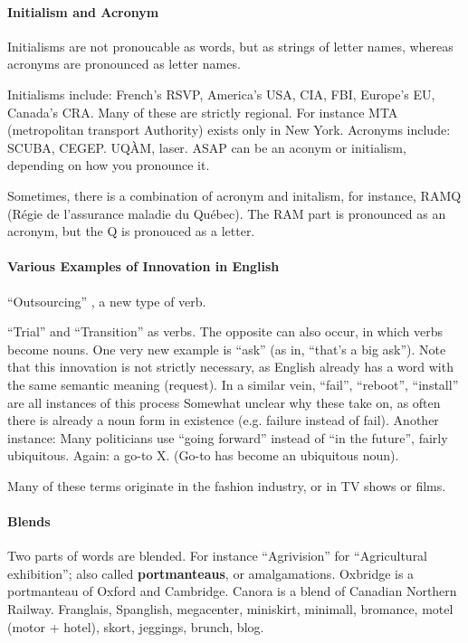 \documentclass{exam}
\begin{document}
\paragraph{Initialism and Acronym} 

Initialisms are not pronoucable as words, but as strings of letter names, whereas acronyms are pronounced as letter names. 

Initialisms include: French's RSVP, America's USA, CIA, FBI, Europe's EU, Canada's CRA. 
Many of these are strictly regional. 
For instance MTA (metropolitan transport Authority) exists only in New York. 
Acronyms include: SCUBA, CEGEP. UQ\`AM, laser.
ASAP can be an aconym or initialism, depending on how you pronounce it. 

Sometimes, there is a combination of acronym and initalism, for instance, RAMQ (R\'egie de l'assurance maladie du Qu\'ebec).
The RAM part is pronounced as an acronym, but the Q is pronouced as a letter.  
\paragraph{Various Examples of Innovation in English}
``Outsourcing'' , a new type of verb.

``Trial'' and ``Transition'' as verbs. 
The opposite can also occur, in which verbs become nouns. 
One very new example is ``ask'' (as in, ``that's a big ask'').
Note that this innovation is not strictly necessary, as English already has a word with the same semantic meaning (request). 
In a similar vein, ``fail'', ``reboot'', ``install'' are all instances of this process 
Somewhat unclear why these take on, as often there is already a noun form in existence (e.g. failure instead of fail). 
Another instance: Many politicians use ``going forward'' instead of ``in the future'', fairly ubiquitous. 
Again: a go-to X. (Go-to has become an ubiquitous noun).

Many of these terms originate in the fashion industry, or in TV shows or films. 

\paragraph{Blends}  Two parts of words are blended. For instance ``Agrivision'' for ``Agricultural exhibition''; also called \textbf{portmanteaus}, or amalgamations.
Oxbridge is a portmanteau of Oxford and Cambridge.
Canora is a blend of Canadian Northern Railway. Franglais, Spanglish, megacenter, miniskirt, minimall, bromance, motel (motor + hotel), skort, jeggings, brunch, blog.   
\end{document}
